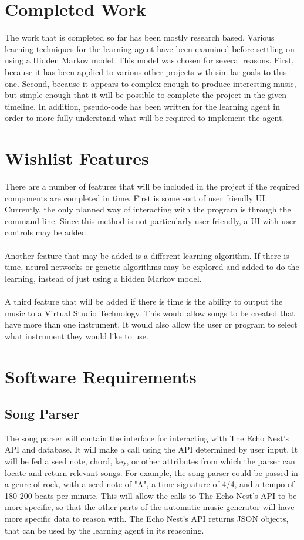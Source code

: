 \documentclass{article}
\begin{document}
\section{Completed Work}
The work that is completed so far has been mostly research based. Various learning techniques for the learning agent have been examined before settling on using a Hidden Markov model. This model was chosen for several reasons. First, because it has been applied to various other projects with similar goals to this one. Second, because it appears to complex enough to produce interesting music, but simple enough that it will be possible to complete the project in the given timeline. In addition, pseudo-code has been written for the learning agent in order to more fully understand what will be required to implement the agent.

\section{Wishlist Features}
There are a number of features that will be included in the project if the required components are completed in time. First is some sort of user friendly UI. Currently, the only planned way of interacting with the program is through the command line. Since this method is not particularly user friendly, a UI with user controls may be added.\\
\\
Another feature that may be added is a different learning algorithm. If there is time, neural networks or genetic algorithms may be explored and added to do the learning, instead of just using a hidden Markov model.\\
\\
A third feature that will be added if there is time is the ability to output the music to a Virtual Studio Technology. This would allow songs to be created that have more than one instrument. It would also allow the user or program to select what instrument they would like to use.

\section{Software Requirements}
\subsection{Song Parser}
The song parser will contain the interface for interacting with The Echo Nest's API and database.  It will make a call using the API determined by user input.  It will be fed a seed note, chord, key, or other attributes from which the parser can locate and return relevant songs.  For example, the song parser could be passed in a genre of rock, with a seed note of "A", a time signature of 4/4, and a tempo of 180-200 beats per minute.  This will allow the calls to The Echo Nest's API to be more specific, so that the other parts of the automatic music generator will have more specific data to reason with.  The Echo Nest's API returns JSON objects, that can be used by the learning agent in its reasoning.
\end{document}
